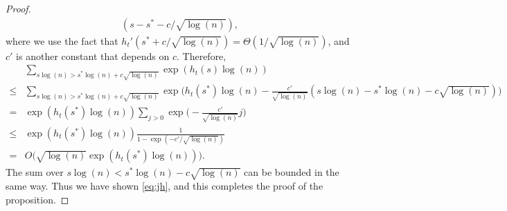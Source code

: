 \documentclass{article}
\begin{document}
\begin{proof}
\begin{align*}
(s- s^\ast - c/\sqrt{\log(n)}) ,
\end{align*}
where we use the fact that $h_t'(s^\ast+c/\sqrt{\log(n)}) = \Theta(1/\sqrt{\log(n)})$, and $c'$ is another constant that depends on $c$.
Therefore,
\begin{align*}
& \sum_{s\log(n) > s^\ast\log(n) + c\sqrt{\log(n)}}
\exp(h_t(s) \log(n))  \\
\le & \sum_{s\log(n) > s^\ast\log(n) + c\sqrt{\log(n)}}
\exp \Big( h_t(s^\ast) \log(n) 
-\frac{c'}{\sqrt{\log(n)}}
(s\log(n)- s^\ast \log(n)- c \sqrt{\log(n)}) \Big)   \\
= & \exp(h_t(s^\ast) \log(n))
\sum_{j>0} \exp \Big( 
-\frac{c'}{\sqrt{\log(n)}} j \Big) \\
\le & \exp(h_t(s^\ast) \log(n))
\frac{1}{1-\exp(-c'/ \sqrt{\log(n)})} \\
= & O\Big(\sqrt{\log(n)} \exp(h_t(s^\ast) \log(n))\Big) .
\end{align*}
The sum over $s\log(n) < s^\ast\log(n) - c\sqrt{\log(n)}$ can be bounded in the same way. Thus we have shown \eqref{eq:jh}, and this completes the proof of the proposition.
\end{proof}
\end{document}
